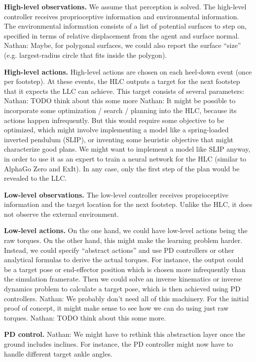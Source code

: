 \documentclass[a4paper]{article}
\newcommand{\nhatch}[1]{{\leavevmode\color{blue} Nathan: #1}}
\begin{document}
\textbf{High-level observations.}
We assume that perception is solved.
The high-level controller receives proprioceptive information and environmental information.
The environmental information consists of a list of potential surfaces to step on, specified in terms of relative displacement from the agent and surface normal.
\nhatch{Maybe, for polygonal surfaces, we could also report the surface ``size'' (e.g. largest-radius circle that fits inside the polygon).}

\textbf{High-level actions.}
High-level actions are chosen on each heel-down event (once per footstep).
At these events, the HLC outputs a target for the next footstep that it expects the LLC can achieve.
This target consists of several parameters: \nhatch{TODO think about this some more}
\nhatch{It might be possible to incorporate some optimization / search / planning into the HLC, because its actions happen infrequently.
But this would require some objective to be optimized, which might involve implementing a model like a spring-loaded inverted pendulum (SLIP), or inventing some heuristic objective that might characterize good plans.
We might want to implement a model like SLIP anyway, in order to use it as an expert to train a neural network for the HLC (similar to AlphaGo Zero and ExIt).
In any case, only the first step of the plan would be revealed to the LLC.}

\textbf{Low-level observations.}
The low-level controller receives proprioceptive information and the target location for the next footstep.
Unlike the HLC, it does not observe the external environment.

\textbf{Low-level actions.}
On the one hand, we could have low-level actions being the raw torques.
On the other hand, this might make the learning problem harder.
Instead, we could specify ``abstract actions'' and use PD controllers or other analytical formulas to derive the actual torques.
For instance, the output could be a target pose or end-effector position which is chosen more infrequently than the simulation framerate.
Then we could solve an inverse kinematics or inverse dynamics problem to calculate a target pose, which is then achieved using PD controllers.
\nhatch{We probably don't need all of this machinery.
For the initial proof of concept, it might make sense to see how we can do using just raw torques.}
\nhatch{TODO think about this some more.}

\textbf{PD control.}
\nhatch{We might have to rethink this abstraction layer once the ground includes inclines.
For instance, the PD controller might now have to handle different target ankle angles.}
\end{document}
